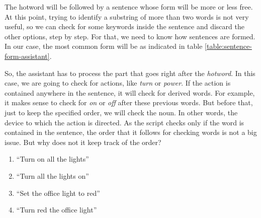 The hotword will be followed by a sentence whose form will be more or less free. At this point, trying to identify a substring of
more than two words is not very useful, so we can check for some keywords inside the sentence and discard the other options, step
by step. For that, we need to know how sentences are formed. In our case, the most common form will be as indicated in table
\ref{table:sentence-form-assistant}.

\begin{table}[]
	\centering
	\caption{Example sentence form for the assistant}
	\label{table:sentence-form-assistant}
\end{table}

So, the assistant has to process the part that goes right after the \textit{hotword}. In this case, we are going to check for actions,
like \textit{turn} or \textit{power}. If the action is contained anywhere in the sentence, it will check for derived words. For
example, it makes sense to check for \textit{on} or \textit{off} after these previous words. But before that, just to keep the
specified order, we will check the noun. In other words, the device to which the action is directed. As the script checks only if
the word is contained in the sentence, the order that it follows for checking words is not a big issue. But why does not it keep
track of the order?

\begin{enumerate}
	\item “Turn on all the lights”
	\item “Turn all the lights on”\\

	\item “Set the office light to red”
	\item “Turn red the office light”
\end{enumerate}

